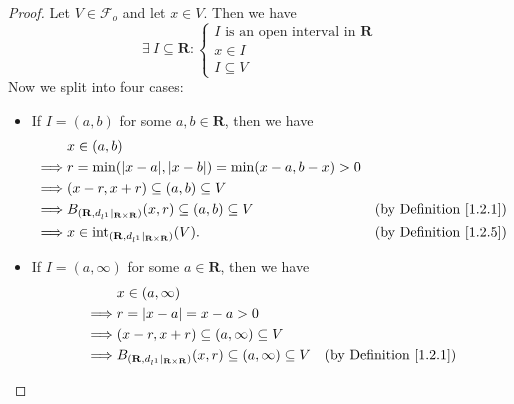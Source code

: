 \begin{proof}
    Let \(V \in \mathcal{F}_o\) and let \(x \in V\).
    Then we have
    \[
        \exists\ I \subseteq \mathbf{R} : \begin{cases}
            I \text{ is an open interval in } \mathbf{R} \\
            x \in I                                      \\
            I \subseteq V
        \end{cases}
    \]
    Now we split into four cases:
    \begin{itemize}
        \item If \(I = (a, b)\) for some \(a, b \in \mathbf{R}\), then we have
              \begin{align*}
                           & x \in (a, b)                                                                                                                      \\
                  \implies & r = \min(\abs*{x - a}, \abs*{x - b}) = \min(x - a, b - x) > 0                                                                     \\
                  \implies & (x - r, x + r) \subseteq (a, b) \subseteq V                                                                                       \\
                  \implies & B_{(\mathbf{R}, d_{l^1}|_{\mathbf{R} \times \mathbf{R}})}(x, r) \subseteq (a, b) \subseteq V & \text{(by Definition \ref{1.2.1})} \\
                  \implies & x \in \text{int}_{(\mathbf{R}, d_{l^1}|_{\mathbf{R} \times \mathbf{R}})}(V).                 & \text{(by Definition \ref{1.2.5})}
              \end{align*}
        \item If \(I = (a, \infty)\) for some \(a \in \mathbf{R}\), then we have
              \begin{align*}
                           & x \in (a, \infty)                                                                                                                      \\
                  \implies & r = \abs*{x - a} = x - a > 0                                                                                                           \\
                  \implies & (x - r, x + r) \subseteq (a, \infty) \subseteq V                                                                                       \\
                  \implies & B_{(\mathbf{R}, d_{l^1}|_{\mathbf{R} \times \mathbf{R}})}(x, r) \subseteq (a, \infty) \subseteq V & \text{(by Definition \ref{1.2.1})} \\

\end{align*}
\end{itemize}
\end{proof}
